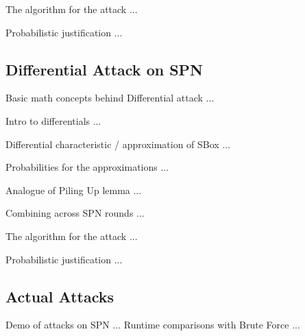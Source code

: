 \documentclass[9pt]{beamer}
\begin{document}
\begin{frame}
The algorithm for the attack ... 

\end{frame}

\begin{frame}
Probabilistic justification ...

\end{frame}

\subsection{Differential Attack on SPN}
\begin{frame}
Basic math concepts behind Differential attack ...

\end{frame}

\begin{frame}
Intro to differentials ... 

\end{frame}

\begin{frame}
Differential characteristic / approximation of SBox ...

\end{frame}

\begin{frame}
Probabilities for the approximations ...

\end{frame}

\begin{frame}
Analogue of Piling Up lemma ...

\end{frame}

\begin{frame}
Combining across SPN rounds ... 

\end{frame}

\begin{frame}
The algorithm for the attack ... 

\end{frame}

\begin{frame}
Probabilistic justification ...

\end{frame}

\subsection{Actual Attacks}
\begin{frame}
Demo of attacks on SPN ... Runtime comparisons with Brute Force ...

\end{frame}
\end{document}
